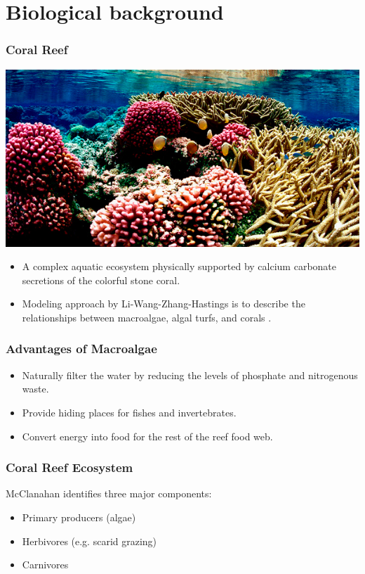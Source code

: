 
\section{Biological background}

\begin{frame}
\frametitle{Coral Reef}
\includegraphics[scale=.175]{./US-Wildlife-coral-1.jpg}
\begin{itemize}
\item A complex aquatic ecosystem physically supported by calcium carbonate secretions of the colorful stone coral.
\item Modeling approach by Li-Wang-Zhang-Hastings is to describe the relationships between macroalgae, algal turfs, and corals \cite{Hastings}.
\end{itemize}
\end{frame}

\begin{frame}
\frametitle{Advantages of Macroalgae}
\begin{itemize}
\item Naturally filter the water by reducing the levels of phosphate and nitrogenous waste.
\item Provide hiding places for fishes and invertebrates.
\item Convert energy into food for the rest of the reef food web.
\end{itemize}
\end{frame}

\begin{frame}
\frametitle{Coral Reef Ecosystem} 

McClanahan identifies three major components\cite{McClanahan}:
\begin{itemize}
\item Primary producers (algae)\\
\item Herbivores (e.g. scarid grazing)\\
\item Carnivores
\end{itemize}
\end{frame}

